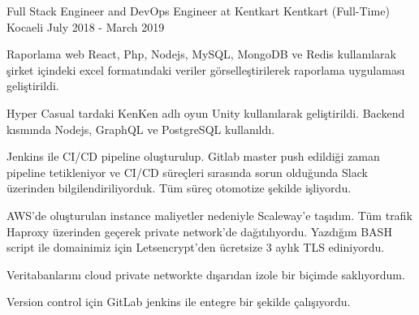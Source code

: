 \begin{cventries}
  \cventry
    {Full Stack Engineer and DevOps Engineer at Kentkart}
    {Kentkart (Full-Time)}
    {Kocaeli}
    {July 2018 - March 2019}
    {
      \begin{cvitems}
        \item {Raporlama web React, Php, Nodejs, MySQL, MongoDB ve Redis kullanılarak şirket içindeki excel formatındaki veriler görselleştirilerek raporlama uygulaması geliştirildi.}
        \item {Hyper Casual tardaki KenKen adlı oyun Unity kullanılarak geliştirildi. Backend kısmında Nodejs, GraphQL ve PostgreSQL kullanıldı.}
        \item {Jenkins ile CI/CD pipeline oluşturulup. Gitlab master push edildiği zaman pipeline tetikleniyor ve CI/CD süreçleri sırasında sorun olduğunda Slack üzerinden bilgilendiriliyorduk. Tüm süreç otomotize şekilde işliyordu.}
        \item {AWS'de oluşturulan instance maliyetler nedeniyle Scaleway'e taşıdım. Tüm trafik Haproxy üzerinden geçerek private network'de dağıtılıyordu. Yazdığım BASH script ile domainimiz için Letsencrypt'den ücretsize 3 aylık TLS ediniyordu.}
        \item {Veritabanlarını cloud private networkte dışarıdan izole bir biçimde saklıyordum.}
        \item {Version control için GitLab jenkins ile entegre bir şekilde çalışıyordu.}
      \end{cvitems}
    }
    
\end{cventries}
